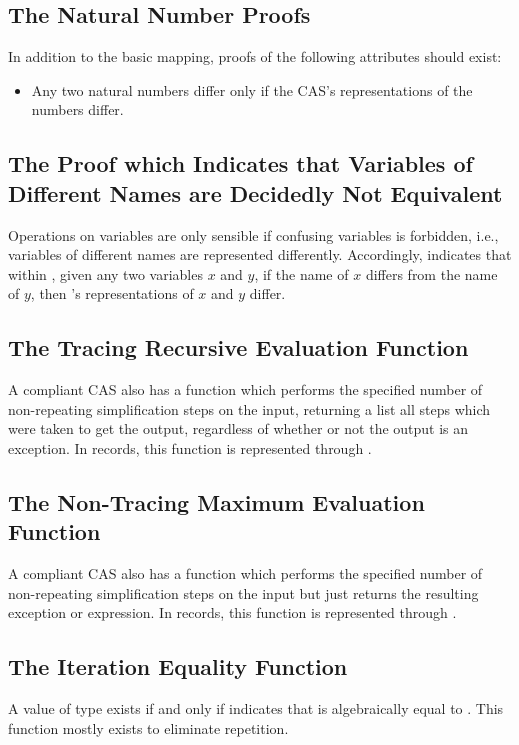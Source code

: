 \documentclass{report}
\begin{document}
\subsection{The Natural Number Proofs}
In addition to the basic mapping, proofs of the following attributes should exist:

\begin{itemize}
  \item Any two natural numbers differ only if the CAS's representations of the numbers differ.
\end{itemize}

\subsection{The Proof which Indicates that Variables of Different Names are Decidedly Not Equivalent}
Operations on variables are only sensible if confusing variables is forbidden, i.e., variables of different names are represented differently.  Accordingly,   indicates that within , given any two variables \(x\) and \(y\), if the name of \(x\) differs from the name of \(y\), then 's representations of \(x\) and \(y\) differ.

\subsection{The Tracing Recursive Evaluation Function}
A compliant CAS also has a function which performs the specified number of non-repeating simplification steps on the input, returning a list all steps which were taken to get the output, regardless of whether or not the output is an exception.  In  records, this function is represented through .

\subsection{The Non-Tracing Maximum Evaluation Function}
A compliant CAS also has a function which performs the specified number of non-repeating simplification steps on the input but just returns the resulting exception or expression.  In  records, this function is represented through .

\subsection{The Iteration Equality Function}
A value of type      exists if and only if      indicates that  is algebraically equal to .  This function mostly exists to eliminate repetition.
\end{document}
